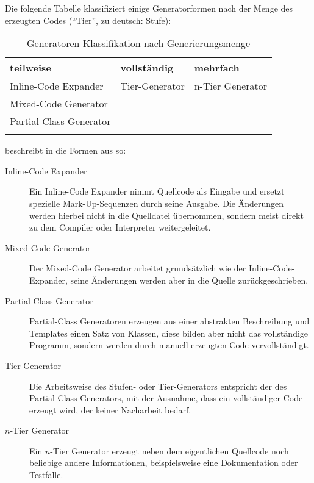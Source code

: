 Die folgende Tabelle klassifiziert einige Generatorformen nach der Menge des erzeugten Codes (\enquote{Tier}, zu deutsch: Stufe):
\begin{table}[htb]
    \begin{longtable}[c]{l l l}
        \toprule
        \rowcolor{lightgray}
        \textbf{teilweise}   & \textbf{vollständig}     & \textbf{mehrfach}\\
        \midrule
        Inline-Code Expander    & Tier-Generator    & n-Tier Generator\\
        Mixed-Code Generator & &\\
        Partial-Class Generator & & \\
        \bottomrule
        \caption{Generatoren Klassifikation nach Generierungsmenge}
        \label{tab:generatorclassification}
    \end{longtable} 
\end{table}

\citeauthor{herrington2003code} beschreibt in \cite[Kapitel 4][]{herrington2003code} die Formen aus  so:
\begin{description}
    \item[Inline-Code Expander]
        Ein Inline-Code Expander nimmt Quellcode als Eingabe und ersetzt spezielle Mark-Up-Sequenzen durch seine Ausgabe. Die Änderungen werden hierbei nicht in die Quelldatei übernommen, sondern meist direkt zu dem Compiler oder Interpreter weitergeleitet.
    \item[Mixed-Code Generator]
        Der Mixed-Code Generator arbeitet grundsätzlich wie der Inline-Code-Expander, seine Änderungen werden aber in die Quelle zurückgeschrieben.
    \item[Partial-Class Generator]
        Partial-Class Generatoren erzeugen aus einer abstrakten Beschreibung und Templates einen Satz von Klassen, diese bilden aber nicht das vollständige Programm, sondern werden durch manuell erzeugten Code vervollständigt. %
    \item[Tier-Generator]
        Die Arbeitsweise des Stufen- oder Tier-Generators entspricht der des Partial-Class Generators, mit der Ausnahme, dass ein vollständiger Code erzeugt wird, der keiner Nacharbeit bedarf.
    \item[$n$-Tier Generator] 
        Ein $n$-Tier Generator erzeugt neben dem eigentlichen Quellcode noch beliebige andere Informationen, beispielsweise eine Dokumentation oder Testfälle.
\end{description}

